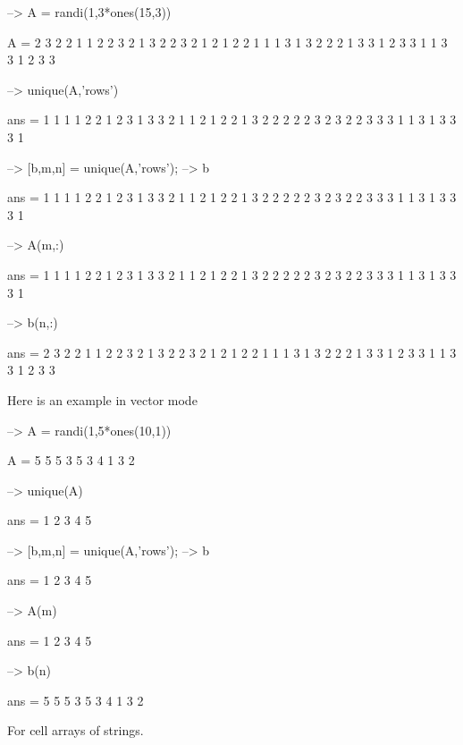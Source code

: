 \begin{DoxyVerbInclude}
--> A = randi(1,3*ones(15,3))

A = 
 2 3 2 
 2 1 1 
 2 2 3 
 2 1 3 
 2 2 3 
 2 1 2 
 1 2 2 
 1 1 1 
 3 1 3 
 2 2 2 
 1 3 3 
 1 2 3 
 3 1 1 
 3 3 1 
 2 3 3 

--> unique(A,'rows')

ans = 
 1 1 1 
 1 2 2 
 1 2 3 
 1 3 3 
 2 1 1 
 2 1 2 
 2 1 3 
 2 2 2 
 2 2 3 
 2 3 2 
 2 3 3 
 3 1 1 
 3 1 3 
 3 3 1 

--> [b,m,n] = unique(A,'rows');
--> b

ans = 
 1 1 1 
 1 2 2 
 1 2 3 
 1 3 3 
 2 1 1 
 2 1 2 
 2 1 3 
 2 2 2 
 2 2 3 
 2 3 2 
 2 3 3 
 3 1 1 
 3 1 3 
 3 3 1 

--> A(m,:)

ans = 
 1 1 1 
 1 2 2 
 1 2 3 
 1 3 3 
 2 1 1 
 2 1 2 
 2 1 3 
 2 2 2 
 2 2 3 
 2 3 2 
 2 3 3 
 3 1 1 
 3 1 3 
 3 3 1 

--> b(n,:)

ans = 
 2 3 2 
 2 1 1 
 2 2 3 
 2 1 3 
 2 2 3 
 2 1 2 
 1 2 2 
 1 1 1 
 3 1 3 
 2 2 2 
 1 3 3 
 1 2 3 
 3 1 1 
 3 3 1 
 2 3 3 
\end{DoxyVerbInclude}


Here is an example in vector mode


\begin{DoxyVerbInclude}
--> A = randi(1,5*ones(10,1))

A = 
 5 
 5 
 5 
 3 
 5 
 3 
 4 
 1 
 3 
 2 

--> unique(A)

ans = 
 1 
 2 
 3 
 4 
 5 

--> [b,m,n] = unique(A,'rows');
--> b

ans = 
 1 
 2 
 3 
 4 
 5 

--> A(m)

ans = 
 1 
 2 
 3 
 4 
 5 

--> b(n)

ans = 
 5 
 5 
 5 
 3 
 5 
 3 
 4 
 1 
 3 
 2 
\end{DoxyVerbInclude}


For cell arrays of strings.


